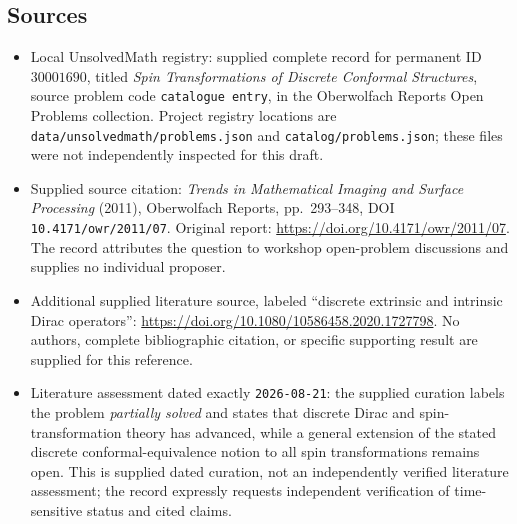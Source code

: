 \documentclass[11pt]{article}
\begin{document}
\subsection{Sources}
\begin{itemize}
\item Local UnsolvedMath registry: supplied complete record for permanent ID \(30001690\), titled \emph{Spin Transformations of Discrete Conformal Structures}, source problem code \texttt{catalogue entry}, in the Oberwolfach Reports Open Problems collection. Project registry locations are \texttt{data/unsolvedmath/problems.json} and \texttt{catalog/problems.json}; these files were not independently inspected for this draft.
\item Supplied source citation: \emph{Trends in Mathematical Imaging and Surface Processing} (2011), Oberwolfach Reports, pp.\ 293--348, DOI \texttt{10.4171/owr/2011/07}. Original report: \url{https://doi.org/10.4171/owr/2011/07}. The record attributes the question to workshop open-problem discussions and supplies no individual proposer.
\item Additional supplied literature source, labeled ``discrete extrinsic and intrinsic Dirac operators'': \url{https://doi.org/10.1080/10586458.2020.1727798}. No authors, complete bibliographic citation, or specific supporting result are supplied for this reference.
\item Literature assessment dated exactly \texttt{2026-08-21}: the supplied curation labels the problem \emph{partially solved} and states that discrete Dirac and spin-transformation theory has advanced, while a general extension of the stated discrete conformal-equivalence notion to all spin transformations remains open. This is supplied dated curation, not an independently verified literature assessment; the record expressly requests independent verification of time-sensitive status and cited claims.
\end{itemize}
\end{document}
